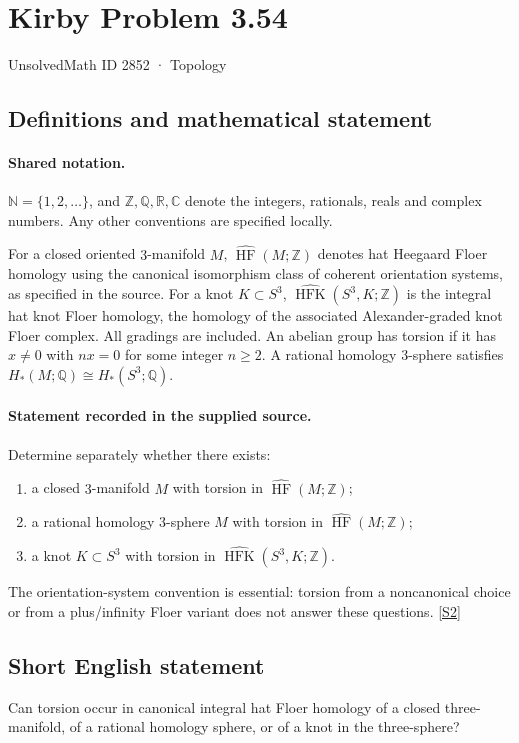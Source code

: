 \documentclass[11pt]{article}
\newcommand{\sref}[2]{\hyperlink{source:#1:#2}{[S#2]}}
\begin{document}
\setcounter{section}{2851}
\section{Kirby Problem 3.54}\label{2852}
{\small\sffamily UnsolvedMath ID 2852 · Topology}
\subsection{Definitions and mathematical statement}

\paragraph{Shared notation.}$\mathbb N=\{1,2,\ldots\}$, and $\mathbb Z,\mathbb Q,\mathbb R,\mathbb C$ denote the integers, rationals, reals and complex numbers. Any other conventions are specified locally.


For a closed oriented $3$-manifold $M$, $\widehat{\operatorname{HF}}(M;\mathbb Z)$ denotes hat Heegaard Floer homology using the canonical isomorphism class of coherent orientation systems, as specified in the source. For a knot $K\subset S^3$, $\widehat{\operatorname{HFK}}(S^3,K;\mathbb Z)$ is the integral hat knot Floer homology, the homology of the associated Alexander-graded knot Floer complex. All gradings are included. An abelian group has torsion if it has $x\ne0$ with $nx=0$ for some integer $n\ge2$. A rational homology $3$-sphere satisfies $H_*(M;\mathbb Q)\cong H_*(S^3;\mathbb Q)$.
\paragraph{Statement recorded in the supplied source.}
Determine separately whether there exists:
\begin{enumerate}
\item a closed $3$-manifold $M$ with torsion in $\widehat{\operatorname{HF}}(M;\mathbb Z)$;
\item a rational homology $3$-sphere $M$ with torsion in $\widehat{\operatorname{HF}}(M;\mathbb Z)$;
\item a knot $K\subset S^3$ with torsion in $\widehat{\operatorname{HFK}}(S^3,K;\mathbb Z)$.
\end{enumerate}
The orientation-system convention is essential: torsion from a noncanonical choice or from a plus/infinity Floer variant does not answer these questions. \sref{2852}{2}
\subsection{Short English statement}
Can torsion occur in canonical integral hat Floer homology of a closed three-manifold, of a rational homology sphere, or of a knot in the three-sphere?
\end{document}
